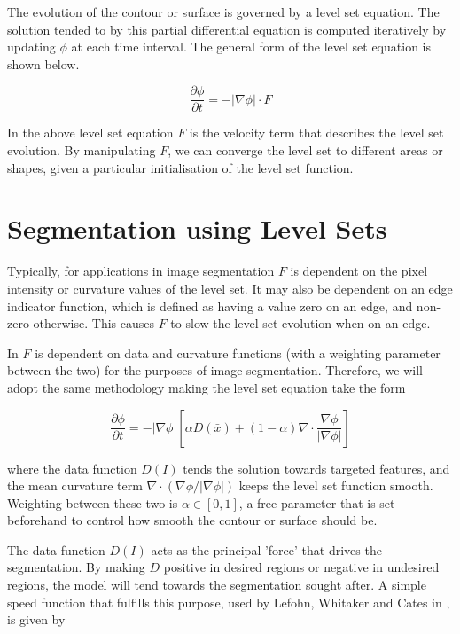 The evolution of the contour or surface is governed by a level set equation. The solution tended to by this partial differential equation is computed iteratively by updating $\phi$ at each time interval. The general form of the level set equation is shown below.

	\begin{equation}
	\frac{\partial{\phi}}{\partial{t}}=-|\nabla{\phi|}\cdot F
	\label{eq:levelsetequation}
	\end{equation}

In the above level set equation $F$ is the velocity term that describes the level set evolution. By manipulating $F$, we can converge the level set to different areas or shapes, given a particular initialisation of the level set function. 

\section{Segmentation using Level Sets}
Typically, for applications in image segmentation $F$ is dependent on the pixel intensity or curvature values of the level set. It may also be dependent on an edge indicator function, which is defined as having a value zero on an edge, and non-zero otherwise. This causes $F$ to slow the level set evolution when on an edge.

In \cite{Lefohn04astreaming} $F$ is dependent on data and curvature functions (with a weighting parameter between the two) for the purposes of image segmentation. Therefore, we will adopt the same methodology making the level set equation take the form

	\begin{equation}
	\frac{\partial{\phi}}{\partial{t}}=-|\nabla{\phi}|\left[\alpha D(\bar{x})  + (1-\alpha)\nabla \cdot{\frac{\nabla{\phi}}{|\nabla{\phi|}}}\right]
	\label{eq:fulllevelsetequation}
	\end{equation}

where the data function $D(I)$ tends the solution towards targeted features, and the mean curvature term $\nabla \cdot{(\nabla{\phi}/|\nabla{\phi|})}$ keeps the level set function smooth. Weighting between these two is $\alpha \in [0,1]$, a free parameter that is set beforehand to control how smooth the contour or surface should be.

The data function $D(I)$ acts as the principal 'force' that drives the segmentation. By making $D$ positive in desired regions or negative in undesired regions, the model will tend towards the segmentation sought after. A simple speed function that fulfills this purpose, used by Lefohn, Whitaker and Cates in \cite{Lefohn04astreaming, gist}, is given by


